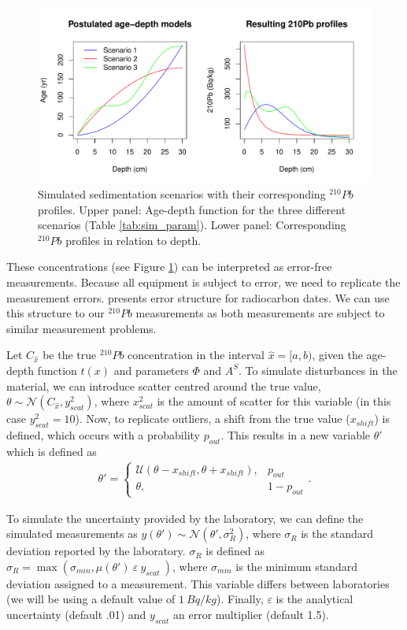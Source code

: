 \documentclass [10pt] {article}
\begin{document}
\begin{figure}[!h]
 \centering
  \includegraphics[width=.95\linewidth]{chronology.pdf}
	\caption{Simulated sedimentation scenarios with their corresponding $^{210}Pb$ profiles. Upper panel: Age-depth function for the three different scenarios (Table \ref{tab:sim_param}). Lower panel: Corresponding $^{210}Pb$ profiles in relation to depth.}
  \label{fig:true_210}
\end{figure}

	These concentrations (see Figure \ref{fig:true_210}) can be interpreted as error-free measurements. 
Because all equipment is subject to error, we need to replicate the measurement errors. 
\citet{Blaauw2018} presents error structure for radiocarbon dates. 
We can use this structure to our $^{210}Pb$ measurements as both measurements are subject to similar measurement problems. 

	Let $C_{\hat{x}}$ be the true  $^{210}Pb$ concentration in the interval $\hat{x}=[a,b)$, given the age-depth function $t(x)$ and parameters $\Phi$ and $A^S$. 
To simulate disturbances in the material, we can introduce scatter centred around the true value, $\theta \sim \mathcal{N}\left(C_{\hat{x}},y^2_{scat}\right)$, where $x^2_{scat}$ is the amount of scatter for this variable (in this case $y^2_{scat}=10$). 
Now, to replicate outliers, a shift from the true value ($x_{shift}$) is defined, which occurs with a probability $p_{out}$. This results in a new variable $\theta'$ which is defined as
\begin{align}
	\theta' = \begin{cases}
			\mathcal{U}(\theta - x_{shift},\theta + x_{shift}), &  p_{out} \\
			\theta, & 1-p_{out}
		\end{cases}.
\end{align}

	To simulate the uncertainty provided by the laboratory, we can define the simulated measurements as  $y(\theta')\sim\mathcal{N}\left(\theta',\sigma_R^2\right)$, where $\sigma_R$ is the standard deviation reported by the laboratory. 
$\sigma_R$ is defined as $\sigma_R= \max \left(\sigma_{min}, \mu(\theta')~\varepsilon~y_{scat}~\right)$, where $\sigma_{min}$ is the minimum standard deviation assigned to a measurement. This variable differs between laboratories (we will be using a default value of $1~ Bq/kg$). 
Finally, $\varepsilon$ is the analytical uncertainty (default .01) and $y_{scat}$ an error multiplier (default 1.5).
\end{document}

